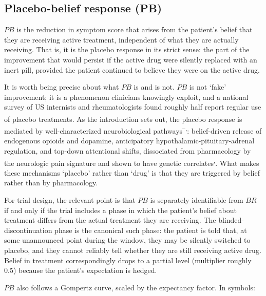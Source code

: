 \documentclass[
  11pt,
]{article}
\begin{document}
\subsection{Placebo-belief response (PB)}\label{placebo-belief-response-pb}

\(PB\) is the reduction in symptom score that arises from the patient's belief
that they are receiving active treatment, independent of what they are
actually receiving. That is, it is the placebo response in its strict sense:
the part of the improvement that would persist if the active drug were
silently replaced with an inert pill, provided the patient continued to
believe they were on the active drug.

It is worth being precise about what \(PB\) is and is not. \(PB\) is not `fake'
improvement; it is a phenomenon clinicians knowingly exploit, and a national
survey of US internists and rheumatologists found roughly half report regular
use of placebo treatments\textsuperscript{}. As the introduction sets out, the
placebo response is mediated by well-characterized neurobiological pathways\textsuperscript{--,}: belief-driven release of endogenous opioids and
dopamine, anticipatory hypothalamic-pituitary-adrenal regulation, and top-down
attentional shifts, dissociated from pharmacology by the\textsuperscript{}
neurologic pain signature\textsuperscript{} and shown to have genetic
correlates\textsuperscript{,}. What makes these mechanisms
`placebo' rather than `drug' is that they are triggered by belief rather than
by pharmacology.

For trial design, the relevant point is that \(PB\) is separately identifiable
from \(BR\) if and only if the trial includes a phase in which the patient's
belief about treatment differs from the actual treatment they are receiving.
The blinded-discontinuation phase is the canonical such phase: the patient is
told that, at some unannounced point during the window, they may be silently
switched to placebo, and they cannot reliably tell whether they are still
receiving active drug. Belief in treatment correspondingly drops to a partial
level (multiplier roughly \(0.5\)) because the patient's expectation is hedged.

\(PB\) also follows a Gompertz curve, scaled by the expectancy factor. In
symbols:
\end{document}
